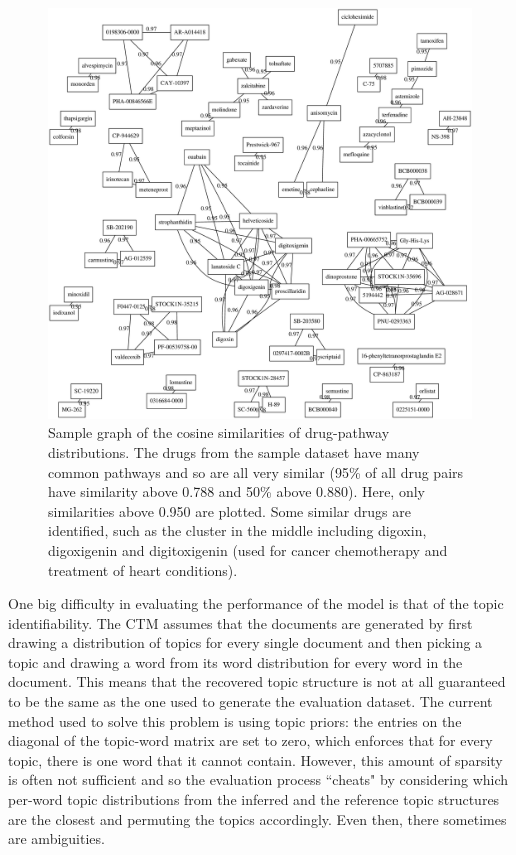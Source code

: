 \documentclass[12pt,a4]{article}
\begin{document}
\begin{figure}[!htb]
\includegraphics[width=\textwidth]{progress-report-drugs.eps}
\caption{Sample graph of the cosine similarities of drug-pathway distributions. The drugs from the sample dataset have many common pathways and so are all very similar (95\% of all drug pairs have similarity above 0.788 and 50\% above 0.880). Here, only similarities above 0.950 are plotted. Some similar drugs are identified, such as the cluster in the middle including digoxin, digoxigenin and digitoxigenin (used for cancer chemotherapy and treatment of heart conditions).}
\end{figure}

One big difficulty in evaluating the performance of the model is that of the topic identifiability. The CTM assumes that the documents are generated by first drawing a distribution of topics for every single document and then picking a topic and drawing a word from its word distribution for every word in the document. This means that the recovered topic structure is not at all guaranteed to be the same as the one used to generate the evaluation dataset. The current method used to solve this problem is using topic priors: the entries on the diagonal of the topic-word matrix are set to zero, which enforces that for every topic, there is one word that it cannot contain. However, this amount of sparsity is often not sufficient and so the evaluation process
``cheats" by considering which per-word topic distributions from the inferred and the reference topic structures are the closest and permuting the topics accordingly. Even then, there sometimes are ambiguities.
\end{document}
